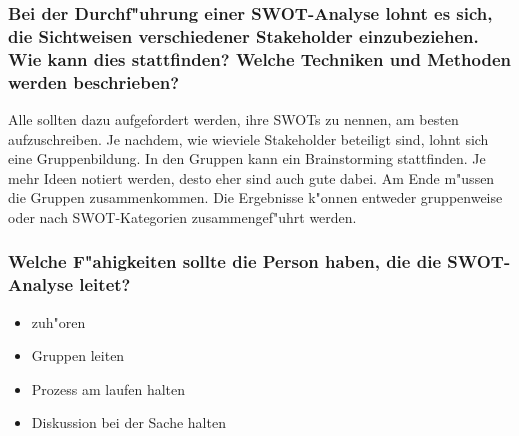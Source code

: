 \subsubsection{Bei der Durchf"uhrung einer SWOT-Analyse lohnt es sich, die Sichtweisen verschiedener Stakeholder einzubeziehen. Wie kann dies stattfinden? Welche Techniken und Methoden werden beschrieben?}
Alle sollten dazu aufgefordert werden, ihre SWOTs zu nennen, am besten aufzuschreiben. Je nachdem, wie wieviele Stakeholder beteiligt sind, lohnt sich eine Gruppenbildung. In den Gruppen kann ein Brainstorming stattfinden. Je mehr Ideen notiert werden, desto eher sind auch gute dabei. Am Ende m"ussen die Gruppen zusammenkommen. Die Ergebnisse k"onnen entweder gruppenweise oder nach SWOT-Kategorien zusammengef"uhrt werden.

\subsubsection{Welche F"ahigkeiten sollte die Person haben, die die SWOT-Analyse leitet?}
\begin{itemize}
        \item zuh"oren 
        \item Gruppen leiten 
        \item Prozess am laufen halten 
        \item Diskussion bei der Sache halten 
\end{itemize}
